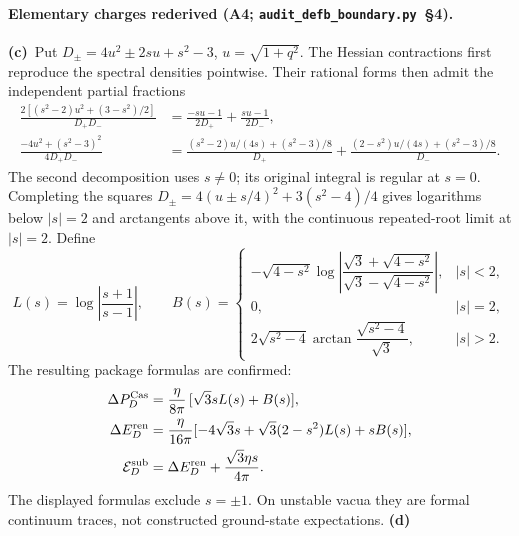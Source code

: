 \documentclass[11pt,a4paper]{article}
\newcommand{\Lc}{\textbf{(c)}\ }
\newcommand{\Ld}{\textbf{(d)}\ }
\newcommand{\scr}{\texttt{audit\_\allowbreak defb\_\allowbreak boundary.py}}
\begin{document}
\paragraph{Elementary charges rederived (A4; \scr\ §4).}
\Lc Put $D_\pm=4u^2\pm2su+s^2-3$, $u=\sqrt{1+q^2}$.
The Hessian contractions first reproduce the spectral densities pointwise.
Their rational forms then admit the independent partial fractions
\begin{align}
 \frac{2[(s^2-2)u^2+(3-s^2)/2]}{D_+D_-}
 &=\frac{-su-1}{2D_+}+\frac{su-1}{2D_-},\\
 \frac{-4u^2+(s^2-3)^2}{4D_+D_-}
 &=\frac{(s^2-2)u/(4s)+(s^2-3)/8}{D_+}
  +\frac{(2-s^2)u/(4s)+(s^2-3)/8}{D_-}.
\end{align}
The second decomposition uses $s\ne0$; its original integral is regular
at $s=0$. Completing the squares
$D_\pm=4(u\pm s/4)^2+3(s^2-4)/4$ gives logarithms below $|s|=2$
and arctangents above it, with the continuous repeated-root limit at $|s|=2$.
Define
\begin{equation}
 L(s)=\log\left|\frac{s+1}{s-1}\right|,\qquad
 B(s)=\begin{cases}
 -\sqrt{4-s^2}\log\left|\dfrac{\sqrt3+\sqrt{4-s^2}}{\sqrt3-\sqrt{4-s^2}}\right|,&|s|<2,\\
 0,&|s|=2,\\
 2\sqrt{s^2-4}\arctan\!\dfrac{\sqrt{s^2-4}}{\sqrt3},&|s|>2.
 \end{cases}
\end{equation}
The resulting package formulas are confirmed:
\begin{align}
 \Delta P_D^{\rm Cas}&=\frac{\eta}{8\pi}\,[\sqrt3sL(s)+B(s)],\\
 \Delta E_D^{\rm ren}&=\frac{\eta}{16\pi}
 [-4\sqrt3s+\sqrt3(2-s^2)L(s)+sB(s)],\\
 \mathcal E_D^{\rm sub}&=\Delta E_D^{\rm ren}+\frac{\sqrt3\eta s}{4\pi}.
 \label{eq:closed}
\end{align}
The displayed formulas exclude $s=\pm1$. On unstable vacua they are formal
continuum traces, not constructed ground-state expectations. \Ld
\end{document}
